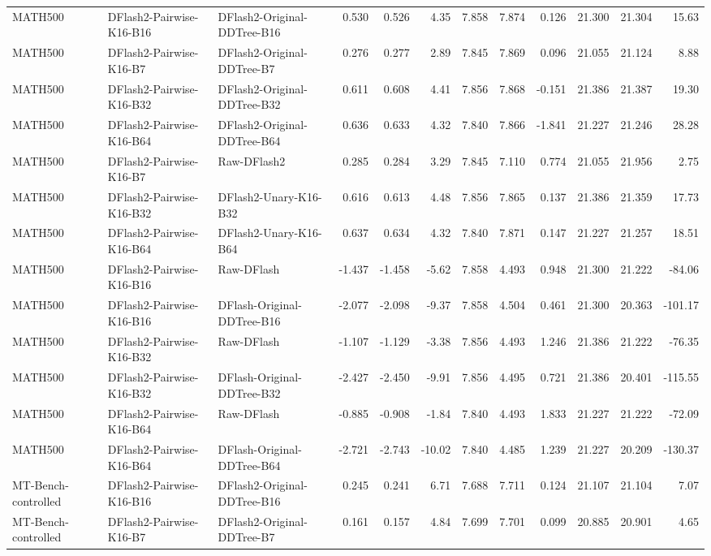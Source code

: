 \begin{longtable}{lllrrrrrrrrr}
MATH500 & DFlash2-Pairwise-K16-B16 & DFlash2-Original-DDTree-B16 & 0.530 & 0.526 & 4.35 & 7.858 & 7.874 & 0.126 & 21.300 & 21.304 & 15.63 \\
MATH500 & DFlash2-Pairwise-K16-B7 & DFlash2-Original-DDTree-B7 & 0.276 & 0.277 & 2.89 & 7.845 & 7.869 & 0.096 & 21.055 & 21.124 & 8.88 \\
MATH500 & DFlash2-Pairwise-K16-B32 & DFlash2-Original-DDTree-B32 & 0.611 & 0.608 & 4.41 & 7.856 & 7.868 & -0.151 & 21.386 & 21.387 & 19.30 \\
MATH500 & DFlash2-Pairwise-K16-B64 & DFlash2-Original-DDTree-B64 & 0.636 & 0.633 & 4.32 & 7.840 & 7.866 & -1.841 & 21.227 & 21.246 & 28.28 \\
MATH500 & DFlash2-Pairwise-K16-B7 & Raw-DFlash2 & 0.285 & 0.284 & 3.29 & 7.845 & 7.110 & 0.774 & 21.055 & 21.956 & 2.75 \\
MATH500 & DFlash2-Pairwise-K16-B32 & DFlash2-Unary-K16-B32 & 0.616 & 0.613 & 4.48 & 7.856 & 7.865 & 0.137 & 21.386 & 21.359 & 17.73 \\
MATH500 & DFlash2-Pairwise-K16-B64 & DFlash2-Unary-K16-B64 & 0.637 & 0.634 & 4.32 & 7.840 & 7.871 & 0.147 & 21.227 & 21.257 & 18.51 \\
MATH500 & DFlash2-Pairwise-K16-B16 & Raw-DFlash & -1.437 & -1.458 & -5.62 & 7.858 & 4.493 & 0.948 & 21.300 & 21.222 & -84.06 \\
MATH500 & DFlash2-Pairwise-K16-B16 & DFlash-Original-DDTree-B16 & -2.077 & -2.098 & -9.37 & 7.858 & 4.504 & 0.461 & 21.300 & 20.363 & -101.17 \\
MATH500 & DFlash2-Pairwise-K16-B32 & Raw-DFlash & -1.107 & -1.129 & -3.38 & 7.856 & 4.493 & 1.246 & 21.386 & 21.222 & -76.35 \\
MATH500 & DFlash2-Pairwise-K16-B32 & DFlash-Original-DDTree-B32 & -2.427 & -2.450 & -9.91 & 7.856 & 4.495 & 0.721 & 21.386 & 20.401 & -115.55 \\
MATH500 & DFlash2-Pairwise-K16-B64 & Raw-DFlash & -0.885 & -0.908 & -1.84 & 7.840 & 4.493 & 1.833 & 21.227 & 21.222 & -72.09 \\
MATH500 & DFlash2-Pairwise-K16-B64 & DFlash-Original-DDTree-B64 & -2.721 & -2.743 & -10.02 & 7.840 & 4.485 & 1.239 & 21.227 & 20.209 & -130.37 \\
MT-Bench-controlled & DFlash2-Pairwise-K16-B16 & DFlash2-Original-DDTree-B16 & 0.245 & 0.241 & 6.71 & 7.688 & 7.711 & 0.124 & 21.107 & 21.104 & 7.07 \\
MT-Bench-controlled & DFlash2-Pairwise-K16-B7 & DFlash2-Original-DDTree-B7 & 0.161 & 0.157 & 4.84 & 7.699 & 7.701 & 0.099 & 20.885 & 20.901 & 4.65 \\

\end{longtable}
